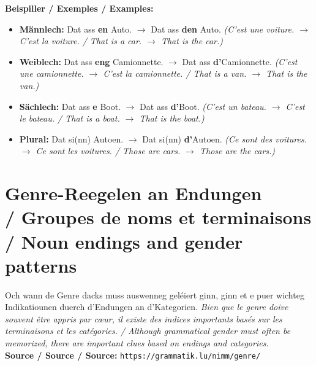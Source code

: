 \vspace{0.5em}
\textbf{Beispiller / Exemples / Examples:}
\begin{itemize}
    \item \textbf{Männlech:} Dat ass \textbf{en} Auto. $\rightarrow$ Dat ass \textbf{den} Auto. \textit{(C'est une voiture. $\rightarrow$ C'est la voiture. / That is a car. $\rightarrow$ That is the car.)}
    \item \textbf{Weiblech:} Dat ass \textbf{eng} Camionnette. $\rightarrow$ Dat ass \textbf{d'}Camionnette. \textit{(C'est une camionnette. $\rightarrow$ C'est la camionnette. / That is a van. $\rightarrow$ That is the van.)}
    \item \textbf{Sächlech:} Dat ass \textbf{e} Boot. $\rightarrow$ Dat ass \textbf{d'}Boot. \textit{(C'est un bateau. $\rightarrow$ C'est le bateau. / That is a boat. $\rightarrow$ That is the boat.)}
    \item \textbf{Plural:} Dat si(nn) Autoen. $\rightarrow$ Dat si(nn) \textbf{d'}Autoen. \textit{(Ce sont des voitures. $\rightarrow$ Ce sont les voitures. / Those are cars. $\rightarrow$ Those are the cars.)}
\end{itemize}

\vspace{1cm}

\section[Genre-Reegelen / Règles de Genre / Gender Rules]{Genre-Reegelen an Endungen \\/ Groupes de noms et terminaisons \\/ Noun endings and gender patterns}

Och wann de Genre dacks muss auswenneg geléiert ginn, ginn et e puer wichteg Indikatiounen duerch d'Endungen an d'Kategorien. \textit{Bien que le genre doive souvent être appris par cœur, il existe des indices importants basés sur les terminaisons et les catégories. / Although grammatical gender must often be memorized, there are important clues based on endings and categories.} \\
\noindent\textbf{Source / Source / Source:} \texttt{https://grammatik.lu/nimm/genre/}

